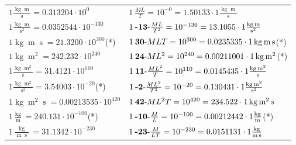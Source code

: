 \begin{center}
\begin{longtable}{l l}
{\color{black}$1 \bm{\mathrm{ }}\frac{\operatorname{kg}\operatorname{m}}{\operatorname{s}} = 0.313204\cdot10^{0} $}&
	{\color{black}$1\:\text{} \frac{ML}{T}=10^{-0} = 1.50133 \cdot 1 \bm{\mathrm{ }}\frac{\operatorname{kg}\operatorname{m}}{\operatorname{s}}$}\\
{\color{black}$1 \bm{\mathrm{ }}\frac{\operatorname{kg}\operatorname{m}}{\operatorname{s}^2} = 0.0352544\cdot10^{-130} $}&
	{\color{black}$1\:\text{\textbf{-13}-} \frac{ML}{T^2}=10^{-130} = 13.1055 \cdot 1 \bm{\mathrm{ }}\frac{\operatorname{kg}\operatorname{m}}{\operatorname{s}^2}$}\\
{\color{black}$1 \bm{\mathrm{ }}\operatorname{kg}\operatorname{m}\operatorname{s} = 21.3200\cdot10^{300} $}\quad(*)&
	{\color{black}$1\:\text{\textbf{30}-} MLT=10^{300} = 0.0235335 \cdot 1 \bm{\mathrm{ }}\operatorname{kg}\operatorname{m}\operatorname{s}$}\quad(*)\\
{\color{black}$1 \bm{\mathrm{ }}\operatorname{kg}\operatorname{m}^2 = 242.232\cdot10^{240} $}&
	{\color{black}$1\:\text{\textbf{24}-} ML^2=10^{240} = 0.00211001 \cdot 1 \bm{\mathrm{ }}\operatorname{kg}\operatorname{m}^2$}\quad(*)\\
{\color{black}$1 \bm{\mathrm{ }}\frac{\operatorname{kg}\operatorname{m}^2}{\operatorname{s}} = 31.4121\cdot10^{110} $}&
	{\color{black}$1\:\text{\textbf{11}-} \frac{ML^2}{T}=10^{110} = 0.0145435 \cdot 1 \bm{\mathrm{ }}\frac{\operatorname{kg}\operatorname{m}^2}{\operatorname{s}}$}\\
{\color{black}$1 \bm{\mathrm{ }}\frac{\operatorname{kg}\operatorname{m}^2}{\operatorname{s}^2} = 3.54003\cdot10^{-20} $}\quad(*)&
	{\color{black}$1\:\text{\textbf{-2}-} \frac{ML^2}{T^2}=10^{-20} = 0.130431 \cdot 1 \bm{\mathrm{ }}\frac{\operatorname{kg}\operatorname{m}^2}{\operatorname{s}^2}$}\\
{\color{black}$1 \bm{\mathrm{ }}\operatorname{kg}\operatorname{m}^2\operatorname{s} = 0.00213535\cdot10^{420} $}&
	{\color{black}$1\:\text{\textbf{42}-} ML^2T=10^{420} = 234.522 \cdot 1 \bm{\mathrm{ }}\operatorname{kg}\operatorname{m}^2\operatorname{s}$}\\
{\color{black}$1 \bm{\mathrm{ }}\frac{\operatorname{kg}}{\operatorname{m}} = 240.131\cdot10^{-100} $}\quad(*)&
	{\color{black}$1\:\text{\textbf{-10}-} \frac{M}{L}=10^{-100} = 0.00212442 \cdot 1 \bm{\mathrm{ }}\frac{\operatorname{kg}}{\operatorname{m}}$}\quad(*)\\
{\color{black}$1 \bm{\mathrm{ }}\frac{\operatorname{kg}}{\operatorname{m}\operatorname{s}} = 31.1342\cdot10^{-230} $}&
	{\color{black}$1\:\text{\textbf{-23}-} \frac{M}{LT}=10^{-230} = 0.0151131 \cdot 1 \bm{\mathrm{ }}\frac{\operatorname{kg}}{\operatorname{m}\operatorname{s}}$}\\

\end{longtable}
\end{center}
